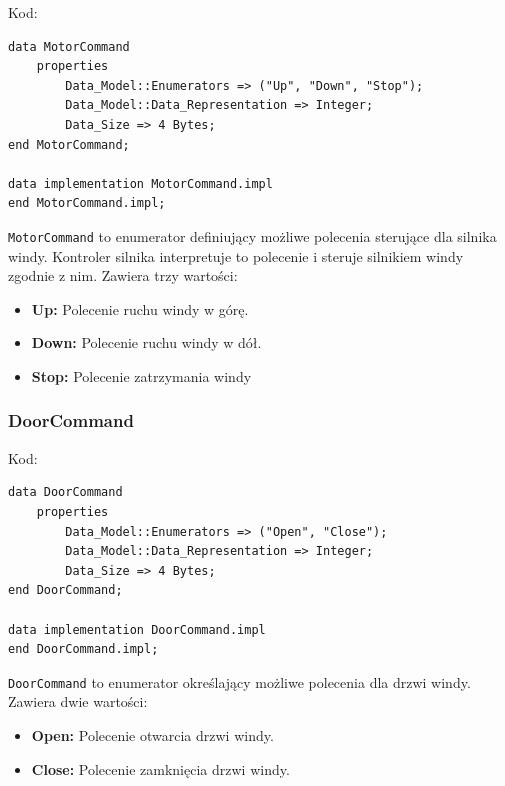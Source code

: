 \documentclass{article}
\begin{document}
    Kod:
    
    \begin{lstlisting}[basicstyle=\ttfamily, keywordstyle=\bfseries]
data MotorCommand
    properties
        Data_Model::Enumerators => ("Up", "Down", "Stop");
        Data_Model::Data_Representation => Integer;
        Data_Size => 4 Bytes;
end MotorCommand;

data implementation MotorCommand.impl
end MotorCommand.impl;
    \end{lstlisting}

    \texttt{MotorCommand} to enumerator definiujący możliwe polecenia sterujące dla silnika windy. Kontroler silnika interpretuje to polecenie i steruje silnikiem windy zgodnie z nim. Zawiera trzy wartości:

    \begin{itemize}
        \item \textbf{Up:} Polecenie ruchu windy w górę.
        \item \textbf{Down:} Polecenie ruchu windy w dół.
        \item \textbf{Stop:} Polecenie zatrzymania windy
    \end{itemize}


    \subsubsection{DoorCommand}

    Kod:
    
    \begin{lstlisting}[basicstyle=\ttfamily, keywordstyle=\bfseries]
data DoorCommand
    properties
        Data_Model::Enumerators => ("Open", "Close");
        Data_Model::Data_Representation => Integer;
        Data_Size => 4 Bytes;
end DoorCommand;

data implementation DoorCommand.impl
end DoorCommand.impl;
    \end{lstlisting}

    \texttt{DoorCommand} to enumerator określający możliwe polecenia dla drzwi windy. Zawiera dwie wartości:

    \begin{itemize}
        \item \textbf{Open:} Polecenie otwarcia drzwi windy.
        \item \textbf{Close:} Polecenie zamknięcia drzwi windy.
    \end{itemize}

    \newpage
\end{document}
